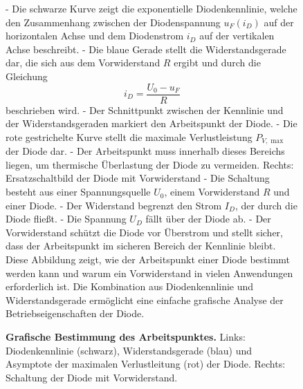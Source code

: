 {\begin{figure}[H]
\begin{minipage}[c]{0.45\textwidth}
{        - Die schwarze Kurve zeigt die exponentielle Diodenkennlinie, welche den Zusammenhang zwischen der Diodenspannung \( u_F(i_D) \) auf der horizontalen Achse und dem Diodenstrom \( i_D \) auf der vertikalen Achse beschreibt.  
        - Die blaue Gerade stellt die Widerstandsgerade dar, die sich aus dem Vorwiderstand \( R \) ergibt und durch die Gleichung  
        \[
        i_D = \frac{U_0 - u_F}{R}
        \]
        beschrieben wird.  
        - Der Schnittpunkt zwischen der Kennlinie und der Widerstandsgeraden markiert den Arbeitspunkt der Diode.  
        - Die rote gestrichelte Kurve stellt die maximale Verlustleistung \( P_{V, \max} \) der Diode dar.  
        - Der Arbeitspunkt muss innerhalb dieses Bereichs liegen, um thermische Überlastung der Diode zu vermeiden.  
        Rechts: Ersatzschaltbild der Diode mit Vorwiderstand  
        - Die Schaltung besteht aus einer Spannungsquelle \( U_0 \), einem Vorwiderstand \( R \) und einer Diode.  
        - Der Widerstand begrenzt den Strom \( I_D \), der durch die Diode fließt.  
        - Die Spannung \( U_D \) fällt über der Diode ab.  
        - Der Vorwiderstand schützt die Diode vor Überstrom und stellt sicher, dass der Arbeitspunkt im sicheren Bereich der Kennlinie bleibt.  
        Diese Abbildung zeigt, wie der Arbeitspunkt einer Diode bestimmt werden kann und warum ein Vorwiderstand in vielen Anwendungen erforderlich ist. Die Kombination aus Diodenkennlinie und Widerstandsgerade ermöglicht eine einfache grafische Analyse der Betriebseigenschaften der Diode.}
    \end{minipage}
    \label{fig:GrafischeBestimmungArbeitspunkt}
    \caption{\textbf{ Grafische Bestimmung des Arbeitspunktes.} Links: Diodenkennlinie (schwarz), Widerstandsgerade (blau) und
        Asymptote der maximalen Verlustleitung (rot) der Diode. Rechts: Schaltung der Diode mit Vorwiderstand.}
\end{figure}
}
%
